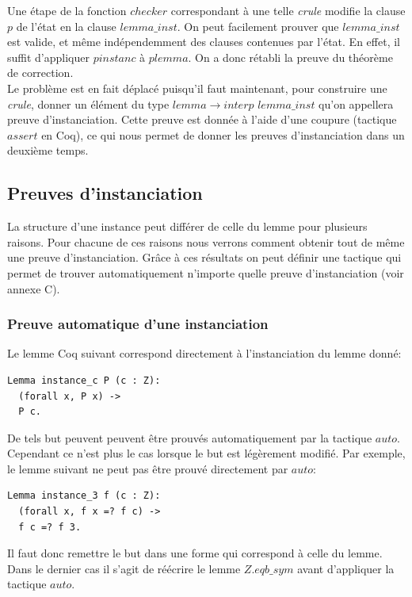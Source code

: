 \documentclass[11pt]{article}
\begin{document}
Une étape de la fonction $checker$ correspondant à une telle \textit{crule} modifie la clause $p$ de l'état en la clause $lemma\_inst$. On peut facilement prouver que $lemma\_inst$ est valide, et même indépendemment des clauses contenues par l'état. En effet, il suffit d'appliquer $pinstanc$ à $plemma$. On a donc rétabli la preuve du théorème de correction.\\

Le problème est en fait déplacé puisqu'il faut maintenant, pour construire une \textit{crule}, donner un élément du type $lemma \rightarrow interp \,\, lemma\_inst$ qu'on appellera preuve d'instanciation. Cette preuve est donnée à l'aide d'une coupure (tactique $assert$ en Coq), ce qui nous permet de donner les preuves d'instanciation dans un deuxième temps.

\subsection{Preuves d'instanciation}

La structure d'une instance peut différer de celle du lemme pour plusieurs raisons. Pour chacune de ces raisons nous verrons comment obtenir tout de même une preuve d'instanciation. Grâce à ces résultats on peut définir une tactique qui permet de trouver automatiquement n'importe quelle preuve d'instanciation (voir annexe C).

\subsubsection{Preuve automatique d'une instanciation} \label{preuve_auto}

Le lemme Coq suivant correspond directement à l'instanciation du lemme donné:
\begin{lstlisting}[frame=single]
Lemma instance_c P (c : Z): 
  (forall x, P x) ->
  P c.
\end{lstlisting}

De tels but peuvent peuvent être prouvés automatiquement par la tactique $auto$. Cependant ce n'est plus le cas lorsque le but est légèrement modifié. Par exemple, le lemme suivant ne peut pas être prouvé directement par $auto$:

\begin{lstlisting}[frame=single]
Lemma instance_3 f (c : Z): 
  (forall x, f x =? f c) ->
  f c =? f 3.
\end{lstlisting}
Il faut donc remettre le but dans une forme qui correspond à celle du lemme. Dans le dernier cas il s'agit de réécrire le lemme $Z.eqb\_sym$ avant d'appliquer la tactique $auto$.
\end{document}
